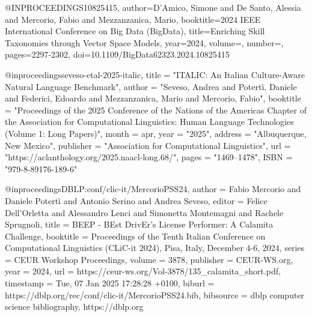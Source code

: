 @INPROCEEDINGS{10825415,
  author={D’Amico, Simone and De Santo, Alessia and Mercorio, Fabio and Mezzanzanica, Mario},
  booktitle={2024 IEEE International Conference on Big Data (BigData)}, 
  title={Enriching Skill Taxonomies through Vector Space Models}, 
  year={2024},
  volume={},
  number={},
  pages={2297-2302},
  doi={10.1109/BigData62323.2024.10825415}}


@inproceedings{seveso-etal-2025-italic,
    title = "ITALIC: An Italian Culture-Aware Natural Language Benchmark",
    author = "Seveso, Andrea  and Potertì, Daniele  and Federici, Edoardo  and Mezzanzanica, Mario  and Mercorio, Fabio",
    booktitle = "Proceedings of the 2025 Conference of the Nations of the Americas Chapter of the Association for Computational Linguistics: Human Language Technologies (Volume 1: Long Papers)",
    month = apr,
    year = "2025",
    address = "Albuquerque, New Mexico",
    publisher = "Association for Computational Linguistics",
    url = "https://aclanthology.org/2025.naacl-long.68/",
    pages = "1469--1478",
    ISBN = "979-8-89176-189-6"}

@inproceedings{DBLP:conf/clic-it/MercorioPSS24,
  author       = {Fabio Mercorio and
                  Daniele Potertì and
                  Antonio Serino and
                  Andrea Seveso},
  editor       = {Felice Dell'Orletta and
                  Alessandro Lenci and
                  Simonetta Montemagni and
                  Rachele Sprugnoli},
  title        = {BEEP - BEst DrivEr's License Performer: A Calamita Challenge},
  booktitle    = {Proceedings of the Tenth Italian Conference on Computational Linguistics
                  (CLiC-it 2024), Pisa, Italy, December 4-6, 2024},
  series       = {CEUR Workshop Proceedings},
  volume       = {3878},
  publisher    = {CEUR-WS.org},
  year         = {2024},
  url          = {https://ceur-ws.org/Vol-3878/135\_calamita\_short.pdf},
  timestamp    = {Tue, 07 Jan 2025 17:28:28 +0100},
  biburl       = {https://dblp.org/rec/conf/clic-it/MercorioPSS24.bib},
  bibsource    = {dblp computer science bibliography, https://dblp.org}
}

